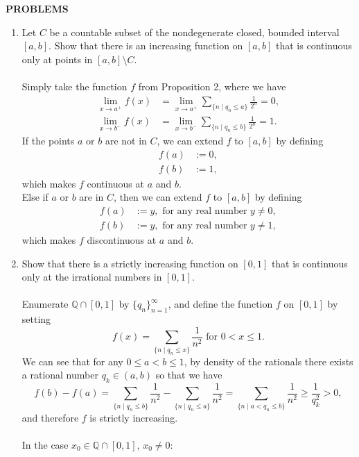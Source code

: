 \begin{center}
	\textbf{PROBLEMS}
\end{center}
\begin{enumerate}
	\setcounter{enumi}{0}
    \item Let $C$ be a countable subset of the nondegenerate closed, bounded interval $[a,b]$. Show that there is an increasing function on $[a,b]$ that is continuous only at points in $[a,b]\setminus C$.\\
    \\Simply take the function $f$ from Proposition 2, where we have
    \begin{align*}
        \lim_{x\to a^+}f(x)&=\lim_{x\to a^+}\sum_{\{n\mid q_n\le a\}}\frac{1}{2^n}=0,\\
        \lim_{x\to b^-}f(x)&=\lim_{x\to b^-}\sum_{\{n\mid q_n\le b\}}\frac{1}{2^n}=1.
    \end{align*}
    If the points $a$ or $b$ are not in $C$, we can extend $f$ to $[a,b]$ by defining
    \begin{align*}
        f(a)&:=0,\\
        f(b)&:=1,
    \end{align*}
    which makes $f$ continuous at $a$ and $b$.
    \\Else if $a$ or $b$ are in $C$, then we can extend $f$ to $[a,b]$ by defining
    \begin{align*}
        f(a)&:=y,\text{ for any real number }y\neq0,\\
        f(b)&:=y,\text{ for any real number }y\neq1,
    \end{align*}
    which makes $f$ discontinuous at $a$ and $b$.
    \item Show that there is a strictly increasing function on $[0,1]$ that is continuous only at the irrational numbers in $[0,1]$.\\
    \\Enumerate $\mathbb{Q}\cap[0,1]$ by $\{q_n\}_{n=1}^\infty$, and define the function $f$ on $[0,1]$ by setting
    \[
        f(x)=\sum_{\{n\mid q_n\le x\}}\frac{1}{n^2}\text{ for }0<x\le1.
    \]
    We can see that for any $0\le a< b\le1$, by density of the rationals there exists a rational number $q_k\in(a,b)$ so that we have
    \[
        f(b)-f(a)=\sum_{\{n\mid q_n\le b\}}\frac{1}{n^2}-\sum_{\{n\mid q_n\le a\}}\frac{1}{n^2}=\sum_{\{n\mid a<q_n\le b\}}\frac{1}{n^2}\ge\frac{1}{q_k^2}>0,
    \]
    and therefore $f$ is strictly increasing.\\
    \\In the case $x_0\in\mathbb{Q}\cap[0,1]$, $x_0\neq0$:

\end{enumerate}
